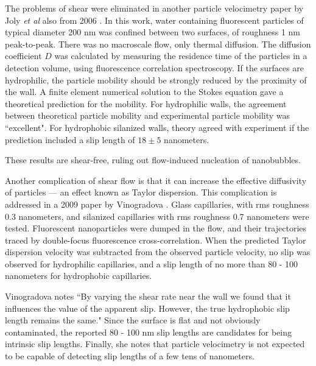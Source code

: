 \documentclass[12pt, a4paper, twoside, openright]{book}
\begin{document}
\vspace*{1em}
The problems of shear were eliminated in another particle velocimetry paper by Joly \emph{et al} also from 2006 \cite{Joly2006}.  In this work, water containing fluorescent particles of typical diameter 200 nm was confined between two surfaces, of roughness 1 nm peak-to-peak. There was no macroscale flow, only thermal diffusion.  The diffusion coefficient $D$ was calculated by measuring the residence time of the particles in a detection volume, using fluorescence correlation spectroscopy. If the surfaces are hydrophilic, the particle mobility should be strongly reduced by the proximity of the wall.  A finite element numerical solution to the Stokes equation gave a theoretical prediction for the mobility. For hydrophilic walls, the agreement between theoretical particle mobility and experimental particle mobility was ``excellent". For hydrophobic silanized walls, theory agreed with experiment if the prediction included a slip length of $18 \pm 5$ nanometers.

These results are shear-free, ruling out flow-induced nucleation of nanobubbles.

\vspace*{1em}
Another complication of shear flow is that it can increase the effective diffusivity of particles --- an effect known as Taylor dispersion. This complication is addressed in a 2009 paper by Vinogradova \cite{Vinogradova2009}. Glass capillaries, with rms roughness 0.3 nanometers, and silanized capillaries with rms roughness 0.7 nanometers were tested. Fluorescent nanoparticles were dumped in the flow, and their trajectories traced by double-focus fluorescence cross-correlation.  When the predicted Taylor dispersion velocity was subtracted from the observed particle velocity, no slip was observed for hydrophilic capillaries, and a slip length of no more than 80 - 100 nanometers for hydrophobic capillaries.

Vinogradova notes
``By varying the shear rate near the wall we found that it influences the value of the apparent slip.  However, the true hydrophobic slip length remains the same."
Since the surface is flat and not obviously contaminated, the reported 80 - 100 nm slip lengths are candidates for being intrinsic slip lengths.  
Finally, she notes that particle velocimetry is not expected to be capable of detecting slip lengths of a few tens of nanometers. 
\end{document}

